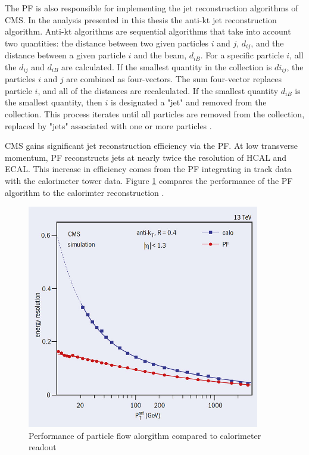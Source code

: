 The PF is also responsible for implementing the jet reconstruction algorithms of CMS. In the analysis presented in this thesis the anti-kt jet reconstruction algorithm. Anti-kt algorithms are sequential algorithms that take into account two quantities: the distance between two given particles $i$ and $j$, $d_{ij}$, and the distance between a given particle $i$ and the beam, $d_{iB}$. For a specific particle $i$, all the $d_{ij}$ and $d_{iB}$ are calculated. If the smallest quantity in the collection is $di_{ij}$, the particles $i$ and $j$ are combined as four-vectors. The sum four-vector replaces particle $i$, and all of the distances are recalculated. If the smallest quantity $d_{iB}$ is the smallest quantity, then $i$ is designated a "jet" and removed from the collection. This process iterates until all particles are removed from the collection, replaced by "jets" associated with one or more particles \cite{Ellis:1993tq}.

CMS gains significant jet reconstruction efficiency via the PF. At low transverse momentum, PF reconstructs jets at nearly twice the resolution of HCAL and ECAL. This increase in efficiency comes from the PF integrating in track data with the calorimeter tower data. Figure \ref{fig:pfPerf} compares the performance of the PF algorithm to the calorimter reconstruction \cite{Sirunyan:2017ulk}.

\begin{figure}[]
\begin{centering}
\includegraphics[width=4in]{Chapter3/importfigs/CCrec2_05_16.jpg}
\par\end{centering}
\caption{Performance of particle flow alorgithm compared to calorimeter readout \cite{Sirunyan:2017ulk} \label{fig:pfPerf}}
\end{figure}

